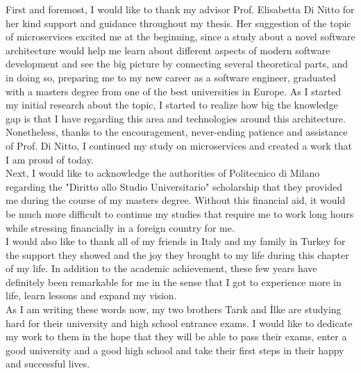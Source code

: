 \documentclass{Configuration_Files/PoliMi3i_thesis}
\begin{document}
First and foremost, I would like to thank my advisor Prof. Elisabetta Di Nitto for her kind support and guidance throughout my thesis.
Her suggestion of the topic of microservices excited me at the beginning, since a study about a novel software architecture would help me learn about different aspects of modern software development and see the big picture by connecting several theoretical parts, and in doing so, preparing me to my new career as a software engineer, graduated with a masters degree from one of the best universities in Europe.
As I started my initial research about the topic, I started to realize how big the knowledge gap is that I have regarding this area and technologies around this architecture.
Nonetheless, thanks to the encouragement, never-ending patience and assistance of Prof. Di Nitto, I continued my study on microservices and created a work that I am proud of today.
\\
Next, I would like to acknowledge the authorities of Politecnico di Milano regarding the "Diritto allo Studio Universitario" scholarship that they provided me during the course of my masters degree.
Without this financial aid, it would be much more difficult to continue my studies that require me to work long hours while stressing financially in a foreign country for me.
\\
I would also like to thank all of my friends in Italy and my family in Turkey for the support they showed and the joy they brought to my life during this chapter of my life.
In addition to the academic achievement, these few years have definitely been remarkable for me in the sense that I got to experience more in life, learn lessons and expand my vision.
\\
As I am writing these words now, my two brothers Tarık and İlke are studying hard for their university and high school entrance exams.
I would like to dedicate my work to them in the hope that they will be able to pass their exams, enter a good university and a good high school and take their first steps in their happy and successful lives.

\cleardoublepage
\end{document}
